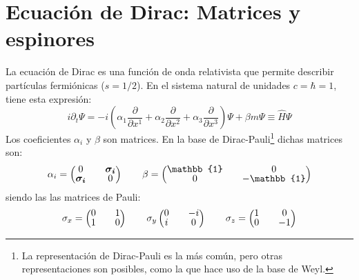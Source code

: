 \section{Ecuación de Dirac: Matrices y espinores}\label{sec:Dirac}
La ecuación de Dirac es una función de onda relativista que permite describir partículas fermiónicas ($s=1/2$). En el sistema natural de unidades $c=\hbar =1$, tiene esta expresión:
\begin{equation}
i\partial _{t}\Psi = -i\left( \alpha _{1}\dfrac{\partial }{\partial x^{1}}+\alpha _{2}\dfrac{\partial }{\partial x^{2}} + \alpha _{3}\dfrac{\partial }{\partial x^{3}}\right) \Psi +\beta m\Psi \equiv\widehat{H}\Psi \label{eq:Dirac}
\end{equation}
Los coeficientes $\alpha_i$ y $\beta$ son matrices. En la base de Dirac-Pauli\footnote{La representación de Dirac-Pauli es la más común, pero otras representaciones son posibles, como la que hace uso de la base de Weyl.} dichas matrices son:
\begin{align}
\alpha _{i}=
\begingroup 
\renewcommand*{\arraystretch}{0.8}
\setlength\arraycolsep{10pt}
\begin{pmatrix} 
0 & \boldsymbol{\sigma_{i}} \\ \boldsymbol{\sigma_{i}} & 0 \end{pmatrix} \qquad
\beta =\begin{pmatrix} \mathbb{1} & 0 \\ 0 & -\mathbb{1} \end{pmatrix}
\endgroup
\end{align}
siendo las  las matrices de Pauli:
\begin{align}
\sigma _{x}=
\begingroup 
\renewcommand*{\arraystretch}{0.8}
\setlength\arraycolsep{10pt}
\begin{pmatrix} 
0 & 1 \\ 1 & 0 \end{pmatrix} \qquad \sigma_y
\begin{pmatrix} 
0 & -i \\ i & 0 \end{pmatrix} \qquad
\sigma_z =\begin{pmatrix} 1 & 0 \\ 0 & -1 \end{pmatrix}
\endgroup
\end{align}

